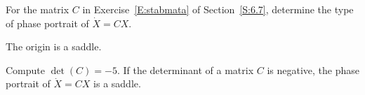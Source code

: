 \documentclass{ximera}
\begin{document}
\begin{exercise} \label{c6.8.1a}
For the matrix $C$ in Exercise~\ref{E:stabmata} of Section~\ref{S:6.7},
determine the type of phase portrait of $\dot{X}=CX$.

\begin{solution}
\ans The origin is a saddle.

\soln Compute $\det(C) = -5$.  If the determinant of a matrix $C$ is
negative, the phase portrait of $\dot{X} = CX$ is a saddle.

\end{solution}
\end{exercise}
\end{document}
